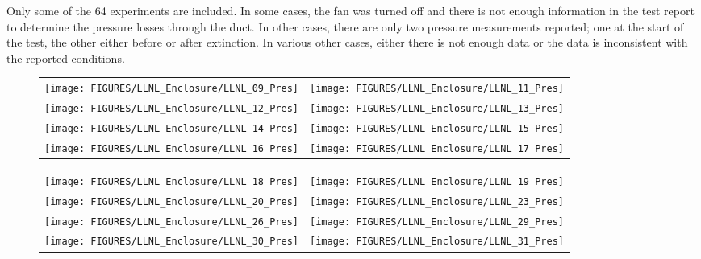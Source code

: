 Only some of the 64 experiments are included. In some cases, the fan was turned off and there is not enough information in the test report to determine the pressure losses through the duct. In other cases, there are only two pressure measurements reported; one at the start of the test, the other either before or after extinction. In various other cases, either there is not enough data or the data is inconsistent with the reported conditions.

\begin{figure}[p]
\begin{tabular*}{\textwidth}{l@{\extracolsep{\fill}}r}
\texttt{[image: FIGURES/LLNL\_Enclosure/LLNL\_09\_Pres]} &
\texttt{[image: FIGURES/LLNL\_Enclosure/LLNL\_11\_Pres]} \\
\texttt{[image: FIGURES/LLNL\_Enclosure/LLNL\_12\_Pres]} &
\texttt{[image: FIGURES/LLNL\_Enclosure/LLNL\_13\_Pres]} \\
\texttt{[image: FIGURES/LLNL\_Enclosure/LLNL\_14\_Pres]} &
\texttt{[image: FIGURES/LLNL\_Enclosure/LLNL\_15\_Pres]} \\
\texttt{[image: FIGURES/LLNL\_Enclosure/LLNL\_16\_Pres]} &
\texttt{[image: FIGURES/LLNL\_Enclosure/LLNL\_17\_Pres]}
\end{tabular*}
\label{LLNL_Enclosure_Pres_2}
\end{figure}

\begin{figure}[p]
\begin{tabular*}{\textwidth}{l@{\extracolsep{\fill}}r}
\texttt{[image: FIGURES/LLNL\_Enclosure/LLNL\_18\_Pres]} &
\texttt{[image: FIGURES/LLNL\_Enclosure/LLNL\_19\_Pres]} \\
\texttt{[image: FIGURES/LLNL\_Enclosure/LLNL\_20\_Pres]} &
\texttt{[image: FIGURES/LLNL\_Enclosure/LLNL\_23\_Pres]} \\
\texttt{[image: FIGURES/LLNL\_Enclosure/LLNL\_26\_Pres]} &
\texttt{[image: FIGURES/LLNL\_Enclosure/LLNL\_29\_Pres]} \\
\texttt{[image: FIGURES/LLNL\_Enclosure/LLNL\_30\_Pres]} &
\texttt{[image: FIGURES/LLNL\_Enclosure/LLNL\_31\_Pres]}
\end{tabular*}
\label{LLNL_Enclosure_Pres_3}
\end{figure}

